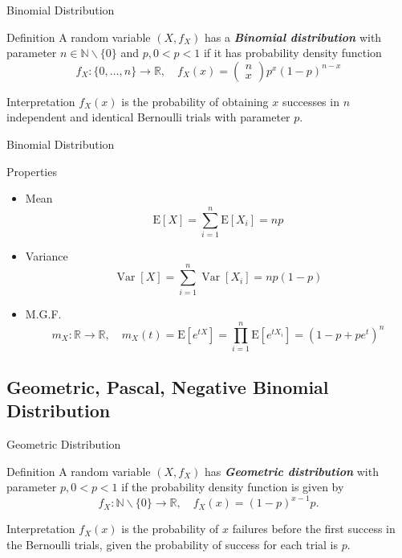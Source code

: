 \documentclass{beamer}
\newcommand{\bb}[1]{\textcolor{antiquefuchsia}{\textbf{\textit{#1}}}}
\begin{document}
\begin{frame}{Binomial Distribution}
\begin{block}{Definition}
A random variable $\left(X, f_{X}\right)$ has a \bb{Binomial distribution} with parameter $n \in \mathbb{N} \backslash\{0\}$ and $p, 0<p<1$ if it has probability density function
$$
f_{X}:\{0, \ldots, n\} \rightarrow \mathbb{R}, \quad f_{X}(x)=\left(\begin{array}{l}
n \\
x
\end{array}\right) p^{x}(1-p)^{n-x}
$$
\end{block} 
\begin{block}{Interpretation}
$f_{X}(x)$ is the probability of obtaining $x$ successes in $n$ independent and identical Bernoulli trials with parameter $p$.
\end{block}
\end{frame}

\begin{frame}{Binomial Distribution}
\begin{block}{Properties}
\begin{itemize}
\item Mean
$$
\mathrm{E}[X]=\sum_{i=1}^{n} \mathrm{E}\left[X_{i}\right]=n p
$$
\item Variance
$$
\operatorname{Var}[X]=\sum_{i=1}^{n} \operatorname{Var}\left[X_{i}\right]=n p(1-p)
$$
\item M.G.F.
$$
m_{X}: \mathbb{R} \rightarrow \mathbb{R}, \quad m_{X}(t)=\mathrm{E}\left[e^{t X}\right]=\prod_{i=1}^{n} \mathrm{E}\left[e^{t X_{i}}\right]=\left(1-p+p e^{t}\right)^{n}
$$
\end{itemize}
\end{block}
\end{frame}


\subsection{Geometric, Pascal, Negative Binomial Distribution}
\begin{frame}{Geometric Distribution}
\begin{block}{Definition}
A random variable $\left(X, f_{X}\right)$ has \bb{Geometric distribution} with parameter $p, 0<p<1$ if the probability density function is given by
$$
f_{X}: \mathbb{N} \backslash\{0\} \rightarrow \mathbb{R}, \quad f_{X}(x)=(1-p)^{x-1} p .
$$
\end{block}
\begin{block}{Interpretation}
$f_{X}(x)$ is the probability of $x$ failures before the first success in the Bernoulli trials, given the probability of success for each trial is $p$.
\end{block}
\end{frame}
\end{document}
